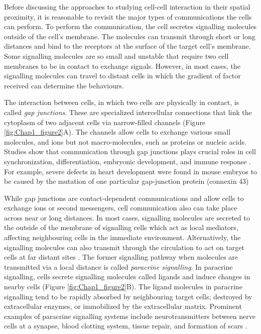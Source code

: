 Before discussing the approaches to studying cell-cell interaction in their spatial proximity, it is reasonable to revisit the major types of communications the cells can perform. To perform the communication, the cell secretes signalling molecules outside of the cell's membrane. The molecules can transmit through short or long distances and bind to the receptors at the surface of the target cell's membrane. Some signalling molecules are so small and unstable that require two cell membranes to be in contact to exchange signals. However, in most cases, the signalling molecules can travel to distant cells in which the gradient of factor received can determine the behaviours.         

The interaction between cells, in which two cells are physically in contact, is called \textit{gap junctions}. These are specialized intercellular connections that link the cytoplasm of two adjacent cells via narrow-filled channels (Figure \ref{fig:Chap1_figure2}A). The channels allow cells to exchange various small molecules, and ions but not macro-molecules, such as proteins or nucleic acids. Studies show that communication through gap junctions plays crucial roles in cell synchronization, differentiation, embryonic development, and immune response \cite{white1999genetic, vinken2006connexins}. For example, severe defects in heart development were found in mouse embryos to be caused by the mutation of one particular gap-junction protein (connexin 43)

While gap junctions are contact-dependent communications and allow cells to exchange ions or second messengers, cell communication also can take place across near or long distances. In most cases, signalling molecules are secreted to the outside of the membrane of signalling cells which act as local mediators, affecting neighbouring cells in the immediate environment. Alternatively, the signalling molecules can also transmit through the circulation to act on target cells at far distant sites \cite{cooper2004cell, alberts2018molecular}. The former signalling pathway when molecules are transmitted via a local distance is called \textit{paracrine signalling}. In paracrine signalling, cells secrete signalling molecules called ligands and induce changes in nearby cells (Figure \ref{fig:Chap1_figure2}B). The ligand molecules in paracrine signalling tend to be rapidly absorbed by neighbouring target cells; destroyed by extracellular enzymes, or immobilized by the extracellular matrix. Prominent examples of paracrine signalling systems include neurotransmitters between nerve cells at a synapse,  blood clotting system, tissue repair, and formation of scars
\cite{huang1998gap}. 

